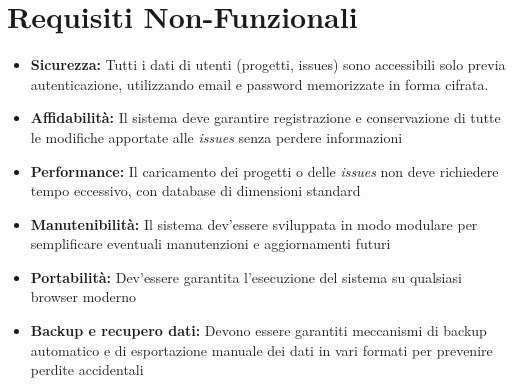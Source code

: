 \section{Requisiti Non-Funzionali}
\begin{itemize}
	\item \textbf{Sicurezza:} Tutti i dati di utenti (progetti, issues) sono accessibili solo 
	previa autenticazione, utilizzando email e password memorizzate in forma cifrata.
	
	\item \textbf{Affidabilità:} Il sistema deve garantire registrazione e conservazione di tutte le modifiche apportate alle \textit{issues} senza perdere informazioni
	
	\item \textbf{Performance:} Il caricamento dei progetti o delle \textit{issues} non deve richiedere tempo eccessivo, con database di dimensioni standard
	
	\item \textbf{Manutenibilità:} Il sistema dev'essere sviluppata in modo modulare per semplificare eventuali manutenzioni e aggiornamenti futuri
	
	\item \textbf{Portabilità:} Dev'essere garantita l'esecuzione del sistema su qualsiasi browser moderno
	
	\item \textbf{Backup e recupero dati:} Devono essere garantiti meccanismi di backup automatico e di esportazione manuale dei dati in vari formati per prevenire perdite accidentali
\end{itemize}
